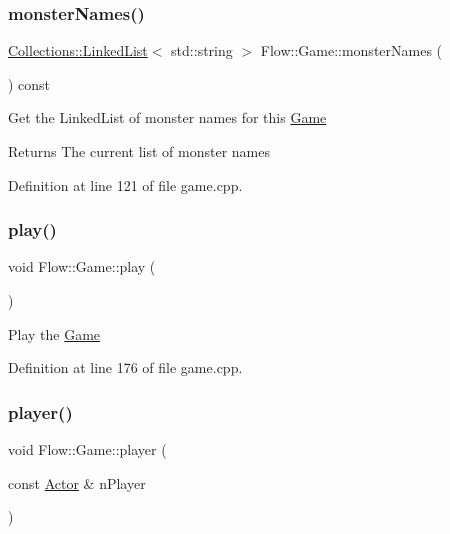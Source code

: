 \subsubsection{\texorpdfstring{monster\+Names()}{monsterNames()}}
{\footnotesize\ttfamily \hyperlink{class_collections_1_1_linked_list}{Collections\+::\+Linked\+List}$<$ std\+::string $>$ Flow\+::\+Game\+::monster\+Names (\begin{DoxyParamCaption}{ }\end{DoxyParamCaption}) const}

Get the Linked\+List of monster names for this \hyperlink{class_flow_1_1_game}{Game} \begin{DoxyReturn}{Returns}
The current list of monster names 
\end{DoxyReturn}


Definition at line 121 of file game.\+cpp.

\hypertarget{class_flow_1_1_game_a3d95d67c58ebe09eb885b86a4d8f82ba}{}\label{class_flow_1_1_game_a3d95d67c58ebe09eb885b86a4d8f82ba} 
\subsubsection{\texorpdfstring{play()}{play()}}
{\footnotesize\ttfamily void Flow\+::\+Game\+::play (\begin{DoxyParamCaption}{ }\end{DoxyParamCaption})}

Play the \hyperlink{class_flow_1_1_game}{Game} 

Definition at line 176 of file game.\+cpp.

\hypertarget{class_flow_1_1_game_a7308fddfe2757534d7012f32730ce465}{}\label{class_flow_1_1_game_a7308fddfe2757534d7012f32730ce465} 
\subsubsection{\texorpdfstring{player()}{player()}\hspace{0.1cm}{\footnotesize\ttfamily [1/2]}}
{\footnotesize\ttfamily void Flow\+::\+Game\+::player (\begin{DoxyParamCaption}\item[{const \hyperlink{class_flow_1_1_actor}{Actor} \&}]{n\+Player }\end{DoxyParamCaption})}

